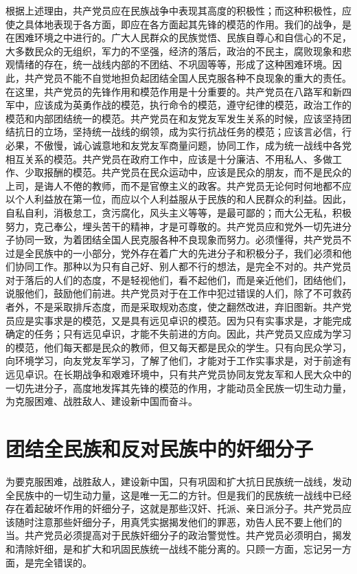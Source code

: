 根据上述理由，共产党员应在民族战争中表现其高度的积极性；而这种积极性，应使之具体地表现于各方面，即应在各方面起其先锋的模范的作用。我们的战争，是在困难环境之中进行的。广大人民群众的民族觉悟、民族自尊心和自信心的不足，大多数民众的无组织，军力的不坚强，经济的落后，政治的不民主，腐败现象和悲观情绪的存在，统一战线内部的不团结、不巩固等等，形成了这种困难环境。因此，共产党员不能不自觉地担负起团结全国人民克服各种不良现象的重大的责任。在这里，共产党员的先锋作用和模范作用是十分重要的。共产党员在八路军和新四军中，应该成为英勇作战的模范，执行命令的模范，遵守纪律的模范，政治工作的模范和内部团结统一的模范。共产党员在和友党友军发生关系的时候，应该坚持团结抗日的立场，坚持统一战线的纲领，成为实行抗战任务的模范；应该言必信，行必果，不傲慢，诚心诚意地和友党友军商量问题，协同工作，成为统一战线中各党相互关系的模范。共产党员在政府工作中，应该是十分廉洁、不用私人、多做工作、少取报酬的模范。共产党员在民众运动中，应该是民众的朋友，而不是民众的上司，是诲人不倦的教师，而不是官僚主义的政客。共产党员无论何时何地都不应以个人利益放在第一位，而应以个人利益服从于民族的和人民群众的利益。因此，自私自利，消极怠工，贪污腐化，风头主义等等，是最可鄙的；而大公无私，积极努力，克己奉公，埋头苦干的精神，才是可尊敬的。共产党员应和党外一切先进分子协同一致，为着团结全国人民克服各种不良现象而努力。必须懂得，共产党员不过是全民族中的一小部分，党外存在着广大的先进分子和积极分子，我们必须和他们协同工作。那种以为只有自己好、别人都不行的想法，是完全不对的。共产党员对于落后的人们的态度，不是轻视他们，看不起他们，而是亲近他们，团结他们，说服他们，鼓励他们前进。共产党员对于在工作中犯过错误的人们，除了不可救药者外，不是采取排斥态度，而是采取规劝态度，使之翻然改进，弃旧图新。共产党员应是实事求是的模范，又是具有远见卓识的模范。因为只有实事求是，才能完成确定的任务；只有远见卓识，才能不失前进的方向。因此，共产党员又应成为学习的模范，他们每天都是民众的教师，但又每天都是民众的学生。只有向民众学习，向环境学习，向友党友军学习，了解了他们，才能对于工作实事求是，对于前途有远见卓识。在长期战争和艰难环境中，只有共产党员协同友党友军和人民大众中的一切先进分子，高度地发挥其先锋的模范的作用，才能动员全民族一切生动力量，为克服困难、战胜敌人、建设新中国而奋斗。

\section{团结全民族和反对民族中的奸细分子}

为要克服困难，战胜敌人，建设新中国，只有巩固和扩大抗日民族统一战线，发动全民族中的一切生动力量，这是唯一无二的方针。但是我们的民族统一战线中已经存在着起破坏作用的奸细分子，这就是那些汉奸、托派、亲日派分子。共产党员应该随时注意那些奸细分子，用真凭实据揭发他们的罪恶，劝告人民不要上他们的当。共产党员必须提高对于民族奸细分子的政治警觉性。共产党员必须明白，揭发和清除奸细，是和扩大和巩固民族统一战线不能分离的。只顾一方面，忘记另一方面，是完全错误的。


